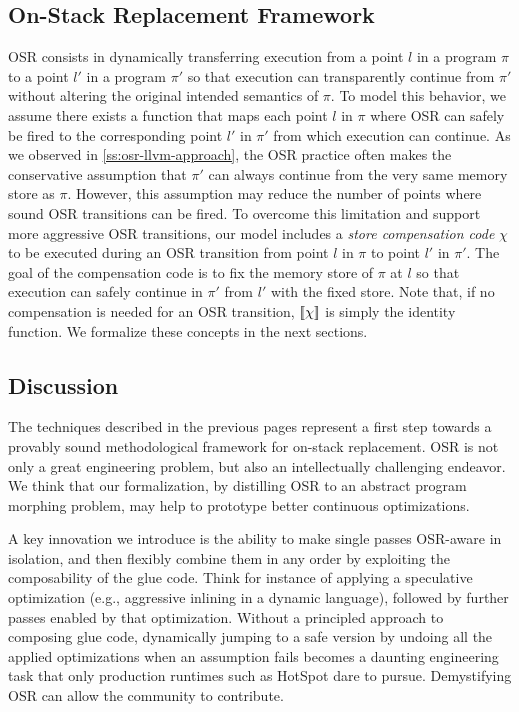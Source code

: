 


\subsection{On-Stack Replacement Framework}
OSR consists in dynamically transferring execution from a point $l$ in a program $\pi$ to a point $l'$ in a program $\pi'$ so that execution can transparently continue from $\pi'$ without altering the original intended semantics of $\pi$. To model this behavior, we assume there exists a function that maps each point $l$ in $\pi$ where OSR can safely be fired to the corresponding point $l'$ in $\pi'$ from which execution can continue.
As we observed in \mysection\ref{ss:osr-llvm-approach}, the OSR practice often makes the conservative assumption that $\pi'$ can always continue from the very same memory store as $\pi$. However, this assumption may reduce the number of points where sound OSR transitions can be fired. To overcome this limitation and support more aggressive OSR transitions, our model includes a {\em store compensation code} $\chi$ to be executed during an OSR transition from point $l$ in $\pi$ to point $l'$ in $\pi'$. The goal of the compensation code is to fix the memory store of $\pi$ at $l$ so that execution can safely continue in $\pi'$ from $l'$ with the fixed store. Note that, if no compensation is needed for an OSR transition, $[\![\chi]\!]$ is simply the identity function. We formalize these concepts in the next sections.







\subsection{Discussion}
The techniques described in the previous pages represent a first step towards a provably sound methodological framework for on-stack replacement. OSR is not only a great engineering problem, but also an intellectually challenging endeavor. We think that our formalization, by distilling OSR to an abstract program morphing problem, may help to prototype better continuous optimizations.

A key innovation we introduce is the ability to make single passes OSR-aware in isolation, and then flexibly combine them in any order by exploiting the composability of the glue code. Think for instance of applying a speculative optimization (e.g., aggressive inlining in a dynamic language), followed by further passes enabled by that optimization. Without a principled approach to composing glue code, dynamically jumping to a safe version by undoing all the applied optimizations when an assumption fails becomes a daunting engineering task that only production runtimes such as HotSpot dare to pursue. Demystifying OSR can allow the community to contribute.

